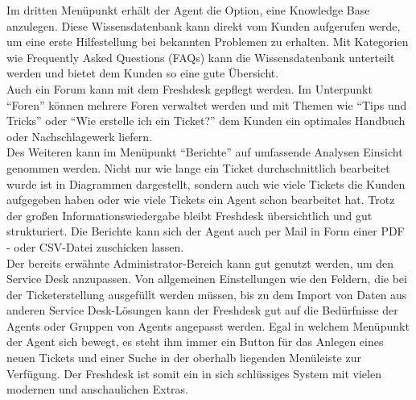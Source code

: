 Im dritten Menüpunkt erhält der Agent die Option, eine Knowledge Base anzulegen. Diese Wissensdatenbank kann direkt vom Kunden aufgerufen werde, um eine erste Hilfestellung bei bekannten Problemen zu erhalten. Mit Kategorien wie Frequently Asked Questions (FAQs) kann die Wissensdatenbank unterteilt werden und bietet dem Kunden so eine gute Übersicht.\\
Auch ein Forum kann mit dem Freshdesk gepflegt werden. Im Unterpunkt \enquote{Foren} können mehrere Foren verwaltet werden und mit Themen wie \enquote{Tips und Tricks} oder \enquote{Wie erstelle ich ein Ticket?} dem Kunden ein optimales Handbuch oder Nachschlagewerk liefern.\\
Des Weiteren kann im Menüpunkt \enquote{Berichte} auf umfassende Analysen Einsicht genommen werden. Nicht nur wie lange ein Ticket durchschnittlich bearbeitet wurde ist in Diagrammen dargestellt, sondern auch wie viele Tickets die Kunden aufgegeben haben oder wie viele Tickets ein Agent schon bearbeitet hat. Trotz der großen Informationswiedergabe bleibt Freshdesk übersichtlich und gut strukturiert. Die Berichte kann sich der Agent auch per Mail in Form einer PDF - oder CSV-Datei zuschicken lassen.\\
Der bereits erwähnte Administrator-Bereich kann gut genutzt werden, um den Service Desk anzupassen. Von allgemeinen Einstellungen wie den Feldern, die bei der Ticketerstellung ausgefüllt werden müssen, bis zu dem Import von Daten aus anderen Service Desk-Lösungen kann der Freshdesk gut auf die Bedürfnisse der Agents oder Gruppen von Agents angepasst werden.
Egal in welchem Menüpunkt der Agent sich bewegt, es steht ihm immer ein Button für das Anlegen eines neuen Tickets und einer Suche in der oberhalb liegenden Menüleiste zur Verfügung. Der Freshdesk ist somit ein in sich schlüssiges System mit vielen modernen und anschaulichen Extras.\\

